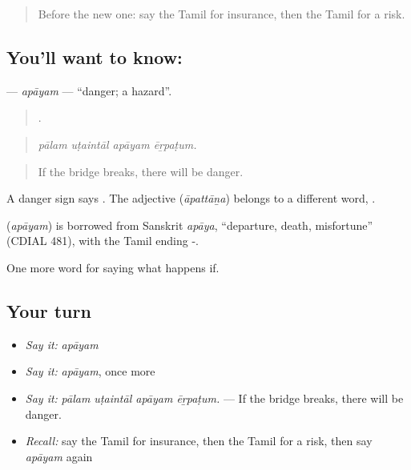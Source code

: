 \label{lesson:TA-C541-apayam}



\begin{quote}
Before the new one: say the Tamil for insurance, then the Tamil for a risk.
\end{quote}

\subsection*{You'll want to know: }
\textbf{} — \emph{apāyam} — \textquotedblleft{}danger; a hazard\textquotedblright{}.

\begin{quote}
   .
\end{quote}

\begin{quote}
\emph{pālam uṭaintāl apāyam ēṟpaṭum.}
\end{quote}

\begin{quote}
If the bridge breaks, there will be danger.
\end{quote}

A danger sign says . The adjective  (\emph{āpattāṉa}) belongs to a different word, .

\begin{cousinweb}
\textbf{} (\emph{apāyam}) is borrowed from Sanskrit \emph{apāya}, \textquotedblleft{}departure, death, misfortune\textquotedblright{} (CDIAL 481), with the Tamil ending -.
\end{cousinweb}

\begin{grammarlens}[title={What you've built}]
One more word for saying what happens if.
\end{grammarlens}

\subsection*{Your turn}
\begin{itemize}
\raggedright
  \item \emph{Say it:} \emph{apāyam}
  \item \emph{Say it:} \emph{apāyam}, once more
  \item \emph{Say it:} \emph{pālam uṭaintāl apāyam ēṟpaṭum.} — If the bridge breaks, there will be danger.
  \item \emph{Recall:} say the Tamil for insurance, then the Tamil for a risk, then say \emph{apāyam} again
\end{itemize}

